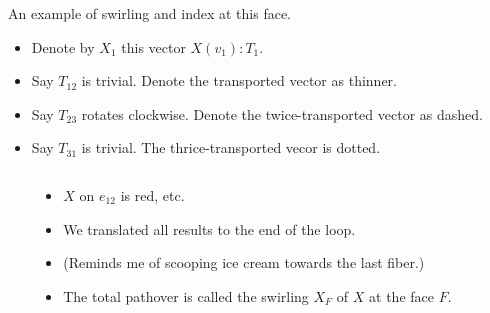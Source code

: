 \begin{frame}
\begin{columns}
\begin{column}{0.65\textwidth}
\vspace{12pt}
\begingroup
{}

\endgroup
\end{column}
\begin{column}{0.35\textwidth}
An example of \alert{swirling} and \alert{index} at this face.
\begin{itemize}
\item<1-> Denote by \( X_1 \) this vector \( X(v_1):T_1 \).
\item<1-> Say \( T_{12} \) is trivial. Denote the transported vector as thinner.
\item<1-> Say \( T_{23} \) rotates clockwise. Denote the twice-transported vector as dashed.
\item<1-> Say \( T_{31} \) is trivial. The thrice-transported vecor is dotted.
\end{itemize}
\end{column}
\end{columns}
\end{frame}

\begin{frame}
\begin{columns}
\begin{column}{0.65\textwidth}
\vspace{12pt}
\begingroup
{}

\endgroup
\end{column}
\begin{column}{0.35\textwidth}
\begin{itemize}
\item<1-> \( X \) on \( e_{12} \) is red, etc.
\item<2-> We translated all results to the end of the loop.
\item<3-> (Reminds me of scooping ice cream towards the last fiber.)
\item<4-> The total pathover is called \alert{the swirling \( X_F \)} of \( X \) at the face \( F \).
\end{itemize}
\end{column}
\end{columns}
\end{frame}


